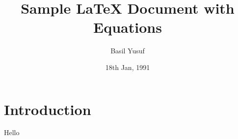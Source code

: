 \documentclass{article}
\title{Sample LaTeX Document with Equations}
\author{Basil Yusuf}
\date{18th Jan, 1991}
\begin{document}
\maketitle

\section{Introduction}
Hello
\end{document}
